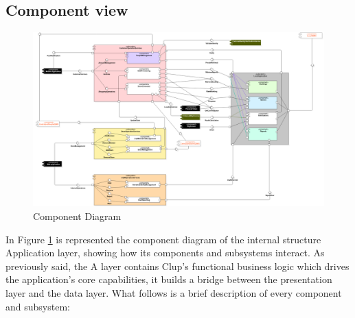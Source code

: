 \subsection{Component view}
\begin{landscape}
\begin{figure}[h!]
	\includegraphics[width=\linewidth]{../Diagrams/ComponentDiagram.png}
	\caption{Component Diagram}
	\label{fig:CompDgm}
\end{figure}
\end{landscape}
In Figure \ref{fig:CompDgm} is represented the component diagram of the internal structure Application layer, showing how its components and subsystems interact. As previously said, the A layer contains Clup's functional business logic which drives the application’s core capabilities, it builds  a bridge between the presentation layer and the data layer. What follows is a brief description of every component and subsystem:
